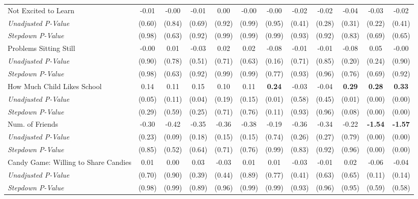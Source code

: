\begin{tabular}{l c c c c c c c c c c c}
Not Excited to Learn & -0.01 & -0.00 & -0.01 & 0.00 & -0.00 & -0.00 & -0.02 & -0.02 & -0.04 & -0.03 & -0.02 \\
\quad \textit{Unadjusted P-Value} & (0.60) & (0.84) & (0.69) & (0.92) & (0.99) & (0.95) & (0.41) & (0.28) & (0.31) & (0.22) & (0.41) \\
\quad \textit{Stepdown P-Value} & (0.98) & (0.63) & (0.92) & (0.99) & (0.99) & (0.99) & (0.93) & (0.92) & (0.83) & (0.69) & (0.65) \\
Problems Sitting Still & -0.00 & 0.01 & -0.03 & 0.02 & 0.02 & -0.08 & -0.01 & -0.01 & -0.08 & 0.05 & -0.00 \\
\quad \textit{Unadjusted P-Value} & (0.90) & (0.78) & (0.51) & (0.71) & (0.63) & (0.16) & (0.71) & (0.85) & (0.20) & (0.24) & (0.90) \\
\quad \textit{Stepdown P-Value} & (0.98) & (0.63) & (0.92) & (0.99) & (0.99) & (0.77) & (0.93) & (0.96) & (0.76) & (0.69) & (0.92) \\
How Much Child Likes School & 0.14 & 0.11 & 0.15 & 0.10 & 0.11 & \textbf{ 0.24 } & -0.03 & -0.04 & \textbf{ 0.29 } & \textbf{ 0.28 } & \textbf{ 0.33 } \\
\quad \textit{Unadjusted P-Value} & (0.05) & (0.11) & (0.04) & (0.19) & (0.15) & (0.01) & (0.58) & (0.45) & (0.01) & (0.00) & (0.00) \\
\quad \textit{Stepdown P-Value} & (0.29) & (0.59) & (0.25) & (0.71) & (0.76) & (0.11) & (0.93) & (0.96) & (0.08) & (0.00) & (0.00) \\
Num. of Friends & -0.30 & -0.42 & -0.35 & -0.36 & -0.38 & -0.19 & -0.36 & -0.34 & -0.22 & \textbf{ -1.54 } & \textbf{ -1.57 } \\
\quad \textit{Unadjusted P-Value} & (0.23) & (0.09) & (0.18) & (0.15) & (0.15) & (0.74) & (0.26) & (0.27) & (0.79) & (0.00) & (0.00) \\
\quad \textit{Stepdown P-Value} & (0.85) & (0.52) & (0.64) & (0.71) & (0.76) & (0.99) & (0.83) & (0.92) & (0.96) & (0.00) & (0.00) \\
Candy Game: Willing to Share Candies & 0.01 & 0.00 & 0.03 & -0.03 & 0.01 & 0.01 & -0.03 & -0.01 & 0.02 & -0.06 & -0.04 \\
\quad \textit{Unadjusted P-Value} & (0.70) & (0.90) & (0.39) & (0.44) & (0.89) & (0.77) & (0.41) & (0.63) & (0.65) & (0.11) & (0.14) \\
\quad \textit{Stepdown P-Value} & (0.98) & (0.99) & (0.89) & (0.96) & (0.99) & (0.99) & (0.93) & (0.96) & (0.95) & (0.59) & (0.58) \\
\bottomrule
\end{tabular}
